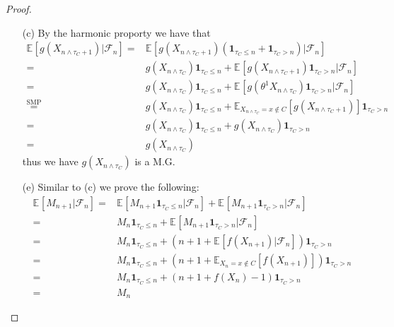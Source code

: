 \documentclass[11pt,a4paper]{article}
\numberwithin{equation}{section}%
\newcommand{\F}{\mathcal{F}}
\begin{document}
\begin{proof}
    \begin{itemize}[topsep=0pt,itemsep=-8pt]
        \item[(c)] By the harmonic proporty we have that 
        \begin{align*}
            \mathbb{E}_{  }\left[  g(X_{n\wedge \tau_C + 1 })| \F_n \right] =& \mathbb{E}_{  }\left[  g(X_{n\wedge \tau_C + 1 }) ( \mathbf{1}_{ \tau_C \leq n  } + \mathbf{1}_{\tau _C > n})  | \F_n \right] \\
            =& g(X_{n\wedge \tau_C}) \mathbf{1}_{\tau_C\leq n} + \mathbb{E}_{  }\left[  g(X_{n\wedge \tau_C + 1 }) \mathbf{1}_{\tau_C > n} | \F_n \right] \\
            =&g( X_{n\wedge \tau_C}) \mathbf{1}_{\tau_C\leq n} + \mathbb{E}_{  }\left[ g(\theta ^1 X_{  n\wedge \tau_C  }) \mathbf{1}_{\tau_C > n} | \F_n \right] \\
            \mathop{ = }\limits^{\text{SMP}}& g( X_{n\wedge \tau_C}) \mathbf{1}_{\tau_C\leq n} + \mathbb{E}_{ X_{n\wedge \tau_C} =x\not\in C }\left[ g( X_{  n\wedge \tau_C +1 })  \right]\mathbf{1}_{\tau_C > n} \\
            =& g( X_{n\wedge \tau_C}) \mathbf{1}_{\tau_C\leq n} + g( X_{n\wedge \tau_C}) \mathbf{1}_{\tau_C > n} \\
            =& g( X_{n\wedge \tau_C})
        \end{align*}
        thus we have $ g(X_{n\wedge \tau_C}) $ is a M.G.
        \item[(e)] 
        Similar to (c) we prove the following:
        \begin{align*}
             \mathbb{E}_{  }\left[ M_{n+1} | \F_n \right] =& \mathbb{E}_{  }\left[ M_{n+1} \mathbf{1}_{\tau_C \leq n} | \F_n \right] + \mathbb{E}_{  }\left[ M_{n+1} \mathbf{1}_{\tau_C > n} | \F_n \right] \\
             =& M_n \mathbf{1}_{\tau_C \leq n} + \mathbb{E}_{  }\left[ M_{n+1} \mathbf{1}_{\tau_C > n} | \F_n \right] \\ 
             =& M_n \mathbf{1}_{\tau_C \leq n} + (n+1 + \mathbb{E}_{  }\left[ f(X_{n + 1}) | \F_n \right])\mathbf{1}_{\tau_C > n}\\ 
             =& M_n \mathbf{1}_{\tau_C \leq n} + (n+1 + \mathbb{E}_{ X_n=x\not\in C }\left[ f(X_{n+1}) \right] )\mathbf{1}_{\tau_C > n}\\
             =& M_n \mathbf{1}_{\tau_C \leq n} + (n+1 + f(X_n)-1 )\mathbf{1}_{\tau_C > n}\\
             =& M_n
        \end{align*}

\end{itemize}
\end{proof}
\end{document}
